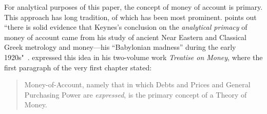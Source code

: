 For analytical purposes of this paper, the concept of money of account is primary. This approach has long tradition, of which \citeauthor{keynes1930a} has been most prominent. \cite{ingham2021} points out ``there is solid evidence that Keynes's conclusion on the \textit{analytical primacy} of money of account came from his study of ancient Near Eastern and Classical Greek metrology and money---his ``Babylonian madness'' during the early 1920s"~\citep[p.~496, emphasis added]{ingham2021}. \citeauthor{keynes1930a} expressed this idea in his two-volume work \textit{Treatise on Money}, where the first paragraph of the very first chapter stated:

\begin{quote}
Money-of-Account, namely that in which Debts and Prices and General Purchasing Power are \textit{expressed}, is the primary concept of a Theory of Money.~\citep[p.~3, emphasis original]{keynes1930a}
\end{quote}


